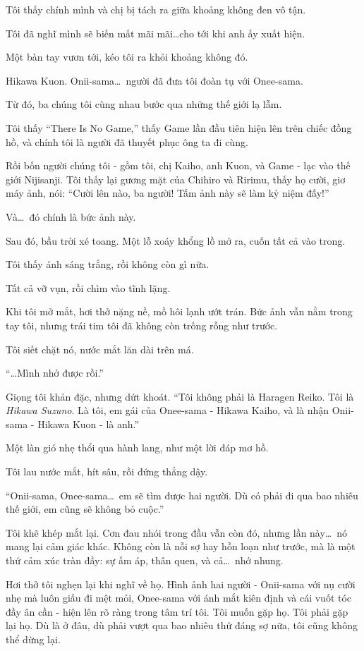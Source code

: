 \documentclass[../main.tex]{subfiles}
\begin{document}
Tôi thấy chính mình và chị bị tách ra giữa khoảng không đen vô tận.

Tôi đã nghĩ mình sẽ biến mất mãi mãi\dots cho tới khi anh ấy xuất hiện.

Một bàn tay vươn tới, kéo tôi ra khỏi khoảng không đó.

Hikawa Kuon. Onii-sama\dots\ người đã đưa tôi đoàn tụ với Onee-sama.

Từ đó, ba chúng tôi cùng nhau bước qua những thế giới lạ lẫm.

Tôi thấy ``There Is No Game,'' thấy Game lần đầu tiên hiện lên trên chiếc đồng hồ, và chính tôi là người đã thuyết phục ông ta đi cùng.

Rồi bốn người chúng tôi - gồm tôi, chị Kaiho, anh Kuon, và Game - lạc vào thế giới Nijisanji. Tôi thấy lại gương mặt của Chihiro và Ririmu, thấy họ cười, giơ máy ảnh, nói: ``Cười lên nào, ba người! Tấm ảnh này sẽ làm kỷ niệm đấy!''

Và\dots\ đó chính là bức ảnh này.

Sau đó, bầu trời xé toang. Một lỗ xoáy khổng lồ mở ra, cuốn tất cả vào trong.

Tôi thấy ánh sáng trắng, rồi không còn gì nữa.

Tất cả vỡ vụn, rồi chìm vào tĩnh lặng.

Khi tôi mở mắt, hơi thở nặng nề, mồ hôi lạnh ướt trán. Bức ảnh vẫn nằm trong tay tôi, nhưng trái tim tôi đã không còn trống rỗng như trước.

Tôi siết chặt nó, nước mắt lăn dài trên má.

``\dots Mình nhớ được rồi.''

Giọng tôi khản đặc, nhưng dứt khoát. ``Tôi không phải là Haragen Reiko. Tôi là \emph{Hikawa Suzuno}. Là tôi, em gái của Onee-sama - Hikawa Kaiho, và là nhận Onii-sama - Hikawa Kuon - là anh.''

Một làn gió nhẹ thổi qua hành lang, như một lời đáp mơ hồ.

Tôi lau nước mắt, hít sâu, rồi đứng thẳng dậy.

``Onii-sama, Onee-sama\dots\ em sẽ tìm được hai người. Dù có phải đi qua bao nhiêu thế giới, em cũng sẽ không bỏ cuộc.''

Tôi khẽ khép mắt lại. Cơn đau nhói trong đầu vẫn còn đó, nhưng lần này\dots\ nó mang lại cảm giác khác. Không còn là nỗi sợ hay hỗn loạn như trước, mà là một thứ cảm xúc tràn đầy: sự ấm áp, thân quen, và cả\dots\ nhớ nhung.

Hơi thở tôi nghẹn lại khi nghĩ về họ. Hình ảnh hai người - Onii-sama với nụ cười nhẹ mà luôn giấu đi mệt mỏi, Onee-sama với ánh mắt kiên định và cái vuốt tóc đầy ân cần - hiện lên rõ ràng trong tâm trí tôi. Tôi muốn gặp họ. Tôi phải gặp lại họ. Dù là ở đâu, dù phải vượt qua bao nhiêu thứ đáng sợ nữa, tôi cũng không thể dừng lại.
\end{document}
